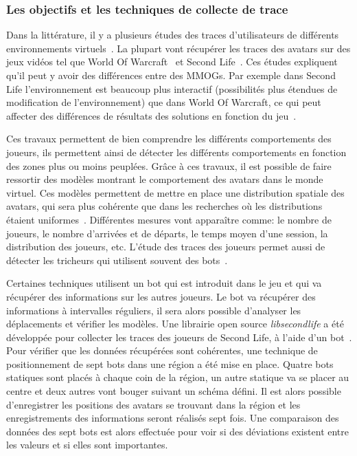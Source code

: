 		\subsubsection{Les objectifs et les techniques de collecte de trace}
		\par Dans la littérature, il y a plusieurs études des traces d'utilisateurs de différents environnements virtuels~\cite{1326262,0295-5075-88-4-48007}. La plupart vont récupérer les traces des avatars sur des jeux vidéos tel que World Of Warcraft~\cite{wow} et Second Life~\cite{sl}. Ces études expliquent qu'il peut y avoir des différences entre des MMOGs. Par exemple dans Second Life l'environnement est beaucoup plus interactif (possibilités plus étendues de modification de l'environnement) que dans World Of Warcraft, ce qui peut affecter des différences de résultats des solutions en fonction du jeu~\cite{DBLP:journals/corr/abs-0807-2328,1613041}. \\
\par Ces travaux permettent de bien comprendre les différents comportements des joueurs, ils permettent ainsi de détecter les différents comportements en fonction des zones plus ou moins peuplées. Grâce à ces travaux, il est possible de faire ressortir des modèles montrant le comportement des avatars dans le monde virtuel. Ces modèles permettent de mettre en place une distribution spatiale des avatars, qui sera plus cohérente que dans les recherches où les distributions étaient uniformes~\cite{Knutsson04peer-to-peersupport}. Différentes mesures vont apparaître comme: le nombre de joueurs, le nombre d'arrivées et de départs, le temps moyen d'une session, la distribution des joueurs, etc. L'étude des traces des joueurs permet aussi de détecter les tricheurs qui utilisent souvent des bots~\cite{0295-5075-88-4-48007}. \\
	\par Certaines techniques utilisent un bot qui est introduit dans le jeu et qui va récupérer des informations sur les autres joueurs. Le bot va récupérer des informations à intervalles réguliers, il sera alors possible d'analyser les déplacements et vérifier les modèles. Une librairie open source \textit{libsecondlife} a été développée pour collecter les traces des joueurs de Second Life, à l'aide d'un bot~\cite{DBLP:journals/corr/abs-0807-2328}. Pour vérifier que les données récupérées sont cohérentes, une technique de positionnement de sept bots dans une région a été mise en place. Quatre bots statiques sont placés à chaque coin de la région, un autre statique va se placer au centre et deux autres vont bouger suivant un schéma défini. Il est alors possible d'enregistrer les positions des avatars se trouvant dans la région et les enregistrements des informations seront réalisés sept fois. Une comparaison des données des sept bots est alors effectuée pour voir si des déviations existent entre les valeurs et si elles sont importantes.\\  
